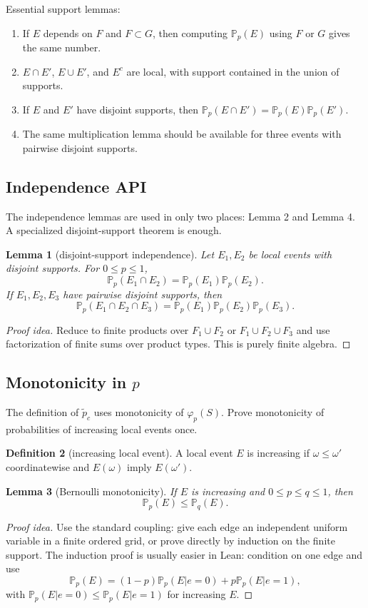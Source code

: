 \documentclass[11pt]{article}
\newcommand{\PP}{\mathbb P}
\newcommand{\ptilde}{\widetilde p_c}
\theoremstyle{definition}
\newtheorem{definition}{Definition}[section]
\theoremstyle{plain}
\newtheorem{lemma}[definition]{Lemma}
\begin{document}
Essential support lemmas:
\begin{enumerate}[label=(S\arabic*)]
  \item If $E$ depends on $F$ and $F\subset G$, then computing $\PP_p(E)$ using $F$ or $G$ gives the same number.
  \item $E\cap E'$, $E\cup E'$, and $E^c$ are local, with support contained in the union of supports.
  \item If $E$ and $E'$ have disjoint supports, then $\PP_p(E\cap E')=\PP_p(E)\PP_p(E')$.
  \item The same multiplication lemma should be available for three events with pairwise disjoint supports.
\end{enumerate}

\subsection{Independence API}

The independence lemmas are used in only two places: Lemma 2 and Lemma 4.  A specialized disjoint-support theorem is enough.

\begin{lemma}[disjoint-support independence]
Let $E_1,E_2$ be local events with disjoint supports.  For $0\le p\le1$,
\[
  \PP_p(E_1\cap E_2)=\PP_p(E_1)\PP_p(E_2).
\]
If $E_1,E_2,E_3$ have pairwise disjoint supports, then
\[
  \PP_p(E_1\cap E_2\cap E_3)
  =\PP_p(E_1)\PP_p(E_2)\PP_p(E_3).
\]
\end{lemma}
\begin{proof}[Proof idea]
Reduce to finite products over $F_1\cup F_2$ or $F_1\cup F_2\cup F_3$ and use factorization of finite sums over product types.  This is purely finite algebra.
\end{proof}

\subsection{Monotonicity in $p$}

The definition of $\ptilde$ uses monotonicity of $\varphi_p(S)$.  Prove monotonicity of probabilities of increasing local events once.

\begin{definition}[increasing local event]
A local event $E$ is increasing if $\omega\le\omega'$ coordinatewise and $E(\omega)$ imply $E(\omega')$.
\end{definition}

\begin{lemma}[Bernoulli monotonicity]
If $E$ is increasing and $0\le p\le q\le1$, then
\[
  \PP_p(E)\le\PP_q(E).
\]
\end{lemma}
\begin{proof}[Proof idea]
Use the standard coupling: give each edge an independent uniform variable in a finite ordered grid, or prove directly by induction on the finite support.  The induction proof is usually easier in Lean: condition on one edge and use
\[
  \PP_p(E)=(1-p)\PP_p(E|e=0)+p\PP_p(E|e=1),
\]
with $\PP_p(E|e=0)\le\PP_p(E|e=1)$ for increasing $E$.
\end{proof}
\end{document}
